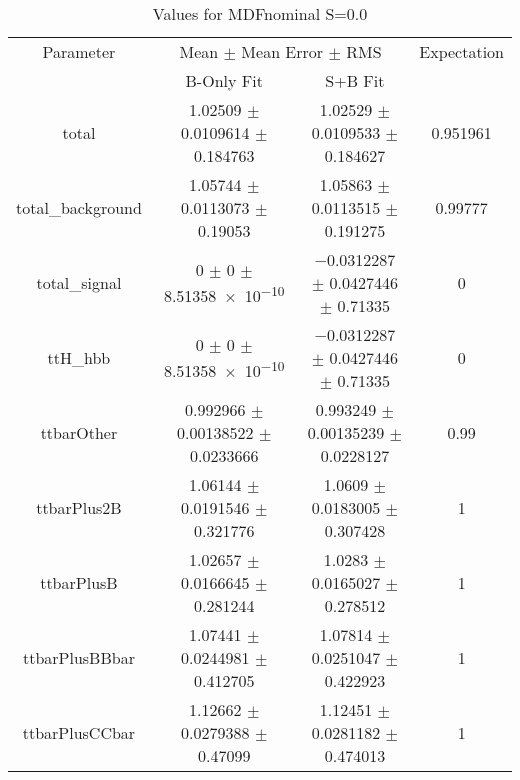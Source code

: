 \begin{table}
\centering
\caption{Values for MDFnominal S=0.0}
\begin{tabular}{cccc}
\toprule
Parameter & \multicolumn{2}{c}{Mean $\pm$ Mean Error $\pm$ RMS} & Expectation\\
 & B-Only Fit & S+B Fit & \\
\midrule
total & \num{1.02509} $\pm$ \num{0.0109614} $\pm$ \num{0.184763} & \num{1.02529} $\pm$ \num{0.0109533} $\pm$ \num{0.184627} & \num{0.951961}\\
total\_background & \num{1.05744} $\pm$ \num{0.0113073} $\pm$ \num{0.19053} & \num{1.05863} $\pm$ \num{0.0113515} $\pm$ \num{0.191275} & \num{0.99777}\\
total\_signal & \num{0} $\pm$ \num{0} $\pm$ \num{8.51358e-10} & \num{-0.0312287} $\pm$ \num{0.0427446} $\pm$ \num{0.71335} & \num{0}\\
ttH\_hbb & \num{0} $\pm$ \num{0} $\pm$ \num{8.51358e-10} & \num{-0.0312287} $\pm$ \num{0.0427446} $\pm$ \num{0.71335} & \num{0}\\
ttbarOther & \num{0.992966} $\pm$ \num{0.00138522} $\pm$ \num{0.0233666} & \num{0.993249} $\pm$ \num{0.00135239} $\pm$ \num{0.0228127} & \num{0.99}\\
ttbarPlus2B & \num{1.06144} $\pm$ \num{0.0191546} $\pm$ \num{0.321776} & \num{1.0609} $\pm$ \num{0.0183005} $\pm$ \num{0.307428} & \num{1}\\
ttbarPlusB & \num{1.02657} $\pm$ \num{0.0166645} $\pm$ \num{0.281244} & \num{1.0283} $\pm$ \num{0.0165027} $\pm$ \num{0.278512} & \num{1}\\
ttbarPlusBBbar & \num{1.07441} $\pm$ \num{0.0244981} $\pm$ \num{0.412705} & \num{1.07814} $\pm$ \num{0.0251047} $\pm$ \num{0.422923} & \num{1}\\
ttbarPlusCCbar & \num{1.12662} $\pm$ \num{0.0279388} $\pm$ \num{0.47099} & \num{1.12451} $\pm$ \num{0.0281182} $\pm$ \num{0.474013} & \num{1}\\
\bottomrule
\end{tabular}
\end{table}